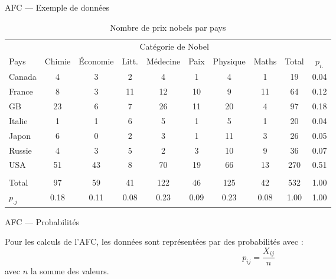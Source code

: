 \begin{frame}{AFC --- Exemple de données}
  \begin{scriptsize}
    \begin{table}
      \begin{tabular}{lccccccccc}
        \toprule
        &\multicolumn{8}{c}{Catégorie de Nobel}&\\
        \cline{2-8}
        Pays & Chimie &	Économie &	Litt. &	Médecine &	Paix &	Physique &	Maths & Total &$p_{i.}$\\
        \midrule
        Canada    &	4 &	3 &	2 &	4 &	1 &	4 &	1 & 19 & 0.04\\
        France    &	8 &	3 &	11 &	12 &	10 &	9 &	11 & 64 & 0.12\\
        GB        &	23 &	6 &	7 &	26 &	11 &	20 &	4 & 97 & 0.18\\
        Italie    &	1 &	1 &	6 &	5 &	1 &	5 &	1 & 20 & 0.04\\
        Japon     &	6 &	0 &	2 &	3 &	1 &	11 &	3 & 26 & 0.05\\
        Russie    &	4 &	3 &	5 &	2 &	3 &	10 &	9 & 36 & 0.07\\
        USA     &	51 &	43 &	8 &	70 &	19 &	66 &	13 & 270 & 0.51\\
        &&&&&&&&&\\
        Total & 97 & 59 & 41 & 122 & 46 & 125 & 42 & 532 & 1.00\\
        \midrule
        $p_{.j}$ & 0.18 & 0.11 & 0.08 & 0.23 & 0.09 & 0.23 & 0.08 & 1.00 &1.00\\
        \bottomrule
      \end{tabular}
      \caption{Nombre de prix nobels par pays}
    \end{table}
  \end{scriptsize}
\end{frame}

\begin{frame}{AFC --- Probabilités}
  \begin{minipage}{0.45\linewidth}
  \end{minipage}
  \hfill
  \begin{minipage}{0.49\linewidth}
    Pour les calculs de l'AFC, les données sont représentées par des probabilités avec :
    \begin{equation*}
      p_{ij}=\frac{X_{ij}}{n} 
    \end{equation*}
    avec $n$ la somme des valeurs.
  \end{minipage}
\end{frame}

